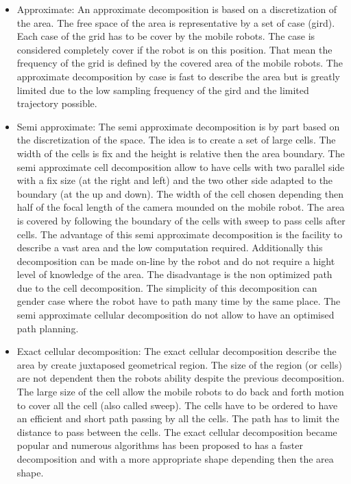 \begin{itemize}
	\item Approximate: 
		An approximate decomposition is based on a discretization of the area. The free space of the area is representative by a set of case (gird). Each case of the grid has to be cover by the mobile robots.  The case is considered  completely cover if the robot is on this position. That mean the frequency of the grid is defined by the covered area of the mobile robots. 
		The approximate decomposition by case is fast to describe the area but is greatly limited due to the low sampling frequency of the gird and the limited trajectory possible.\\
	 
	\item Semi approximate: 
	 The semi approximate decomposition is by part based on the discretization of the space. The idea is to create a set of large cells. The width of the cells is fix and the height is relative then the area boundary. 
	 The semi approximate cell decomposition allow to have cells with two parallel side  with a fix size  (at the right and left) and  the  two other side adapted to the boundary (at the up and down).  The width  of  the cell chosen depending then half of the focal length of the camera mounded on the mobile robot. The area is covered by following the boundary of the cells with sweep to pass cells  after cells.
	 The advantage of this semi approximate decomposition is the facility to describe a vast area and the low computation required. Additionally this decomposition can be made on-line by the robot and do not require a hight level of knowledge of the area. The disadvantage is the non optimized path due to the cell decomposition. The simplicity  of this decomposition  can gender case where the robot have to path many time by the same place. The semi approximate cellular decomposition do not allow to have an optimised path planning. 
	\item Exact cellular decomposition: 
	The exact cellular decomposition describe the area by create juxtaposed geometrical region. The size of the region (or cells) are not dependent then the robots ability despite the previous decomposition. The large size of the cell allow the  mobile robots to  do back and forth motion to cover all the cell (also called sweep).  The cells have to be ordered to have an efficient and short path passing by all the cells. The path has to limit the distance to pass  between the cells.
	The exact cellular decomposition became popular and numerous algorithms has been proposed to has  a faster decomposition and with a more appropriate shape depending then the area shape. 

\end{itemize}
